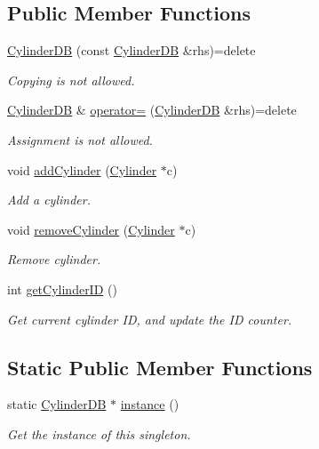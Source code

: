 \subsection*{Public Member Functions}
\begin{DoxyCompactItemize}
\item 
\hyperlink{classCylinderDB_aa93ff07349bc010760d2d55c4d839b80}{Cylinder\+D\+B} (const \hyperlink{classCylinderDB}{Cylinder\+D\+B} \&rhs)=delete
\begin{DoxyCompactList}\small\item\em Copying is not allowed. \end{DoxyCompactList}\item 
\hyperlink{classCylinderDB}{Cylinder\+D\+B} \& \hyperlink{classCylinderDB_ad98ae8201bf8b1a4851e362b7087f009}{operator=} (\hyperlink{classCylinderDB}{Cylinder\+D\+B} \&rhs)=delete
\begin{DoxyCompactList}\small\item\em Assignment is not allowed. \end{DoxyCompactList}\item 
void \hyperlink{classCylinderDB_a69f4490e7ba17defd474c5079d6c07ed}{add\+Cylinder} (\hyperlink{classCylinder}{Cylinder} $\ast$c)
\begin{DoxyCompactList}\small\item\em Add a cylinder. \end{DoxyCompactList}\item 
void \hyperlink{classCylinderDB_a537ca715764226246cf7ef49dd0b65e6}{remove\+Cylinder} (\hyperlink{classCylinder}{Cylinder} $\ast$c)
\begin{DoxyCompactList}\small\item\em Remove cylinder. \end{DoxyCompactList}\item 
int \hyperlink{classCylinderDB_aa2c676092ceee00cd188a8ffa21f1664}{get\+Cylinder\+I\+D} ()
\begin{DoxyCompactList}\small\item\em Get current cylinder I\+D, and update the I\+D counter. \end{DoxyCompactList}\end{DoxyCompactItemize}
\subsection*{Static Public Member Functions}
\begin{DoxyCompactItemize}
\item 
static \hyperlink{classCylinderDB}{Cylinder\+D\+B} $\ast$ \hyperlink{classCylinderDB_a406bd9d3791f6e50aa4fbd1ee99c1dcd}{instance} ()
\begin{DoxyCompactList}\small\item\em Get the instance of this singleton. \end{DoxyCompactList}\end{DoxyCompactItemize}
